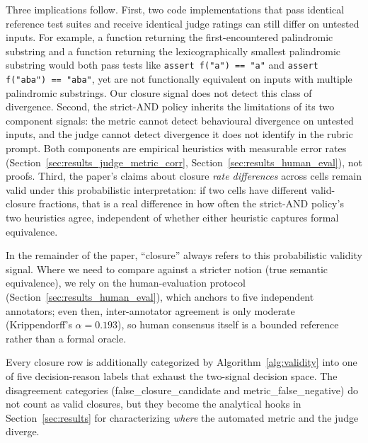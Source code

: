 Three implications follow. First, two code implementations that pass identical reference test suites and receive identical judge ratings can still differ on untested inputs. For example, a function returning the first-encountered palindromic substring and a function returning the lexicographically smallest palindromic substring would both pass tests like \texttt{assert f("a") == "a"} and \texttt{assert f("aba") == "aba"}, yet are not functionally equivalent on inputs with multiple palindromic substrings. Our closure signal does not detect this class of divergence. Second, the strict-AND policy inherits the limitations of its two component signals: the metric cannot detect behavioural divergence on untested inputs, and the judge cannot detect divergence it does not identify in the rubric prompt. Both components are empirical heuristics with measurable error rates (Section~\ref{sec:results_judge_metric_corr}, Section~\ref{sec:results_human_eval}), not proofs. Third, the paper's claims about closure \emph{rate differences} across cells remain valid under this probabilistic interpretation: if two cells have different valid-closure fractions, that is a real difference in how often the strict-AND policy's two heuristics agree, independent of whether either heuristic captures formal equivalence.

In the remainder of the paper, ``closure'' always refers to this probabilistic validity signal. Where we need to compare against a stricter notion (true semantic equivalence), we rely on the human-evaluation protocol (Section~\ref{sec:results_human_eval}), which anchors to five independent annotators; even then, inter-annotator agreement is only moderate (Krippendorff's $\alpha = 0.193$), so human consensus itself is a bounded reference rather than a formal oracle.

Every closure row is additionally categorized by Algorithm~\ref{alg:validity} into one of five decision-reason labels that exhaust the two-signal decision space. The disagreement categories (\textsf{false\_closure\_candidate} and \textsf{metric\_false\_negative}) do not count as valid closures, but they become the analytical hooks in Section~\ref{sec:results} for characterizing \emph{where} the automated metric and the judge diverge.

